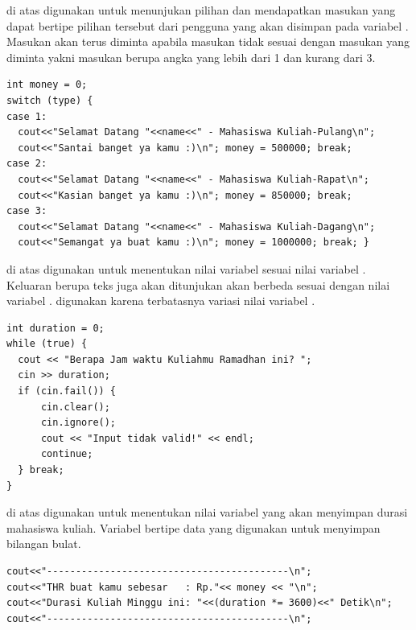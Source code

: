 \documentclass[../main.tex]{subfiles}
\begin{document}
    {\Script} di atas digunakan untuk menunjukan pilihan dan mendapatkan masukan yang dapat bertipe pilihan tersebut dari pengguna yang akan disimpan pada variabel . Masukan akan terus diminta apabila masukan tidak sesuai dengan masukan yang diminta yakni masukan berupa angka yang lebih dari 1 dan kurang dari 3.

\begin{code}
\begin{verbatim}
int money = 0;
switch (type) {
case 1:
  cout<<"Selamat Datang "<<name<<" - Mahasiswa Kuliah-Pulang\n";
  cout<<"Santai banget ya kamu :)\n"; money = 500000; break;
case 2:
  cout<<"Selamat Datang "<<name<<" - Mahasiswa Kuliah-Rapat\n";
  cout<<"Kasian banget ya kamu :)\n"; money = 850000; break;
case 3:
  cout<<"Selamat Datang "<<name<<" - Mahasiswa Kuliah-Dagang\n";
  cout<<"Semangat ya buat kamu :)\n"; money = 1000000; break; }
\end{verbatim}
\end{code}

    {\Script} di atas digunakan untuk menentukan nilai variabel  sesuai nilai variabel . Keluaran berupa teks juga akan ditunjukan akan berbeda sesuai dengan nilai variabel . {\Statement}  digunakan karena terbatasnya variasi nilai variabel .

\begin{code}
\begin{verbatim}
int duration = 0;
while (true) {
  cout << "Berapa Jam waktu Kuliahmu Ramadhan ini? ";
  cin >> duration;
  if (cin.fail()) {
      cin.clear();
      cin.ignore();
      cout << "Input tidak valid!" << endl;
      continue;
  } break;
}
\end{verbatim}
\end{code}

    {\Script} di atas digunakan untuk menentukan nilai variabel  yang akan menyimpan durasi mahasiswa kuliah. Variabel  bertipe data  yang digunakan untuk menyimpan bilangan bulat.

\begin{code}
\begin{verbatim}
cout<<"------------------------------------------\n";
cout<<"THR buat kamu sebesar   : Rp."<< money << "\n";
cout<<"Durasi Kuliah Minggu ini: "<<(duration *= 3600)<<" Detik\n";
cout<<"------------------------------------------\n";
\end{verbatim}
\end{code}
\end{document}
